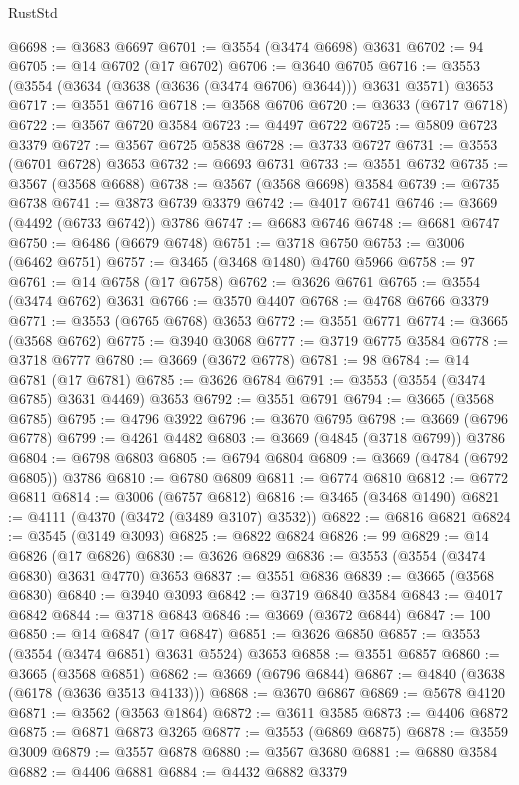 \begin{lexlean}{RustStd}
\begin{coremodule}
@6698 := @3683 @6697
@6701 := @3554 (@3474 @6698) @3631
@6702 := 94
@6705 := @14 @6702 (@17 @6702)
@6706 := @3640 @6705
@6716 := @3553 (@3554 (@3634 (@3638 (@3636 (@3474 @6706) @3644))) @3631 @3571) @3653
@6717 := @3551 @6716
@6718 := @3568 @6706
@6720 := @3633 (@6717 @6718)
@6722 := @3567 @6720 @3584
@6723 := @4497 @6722
@6725 := @5809 @6723 @3379
@6727 := @3567 @6725 @5838
@6728 := @3733 @6727
@6731 := @3553 (@6701 @6728) @3653
@6732 := @6693 @6731
@6733 := @3551 @6732
@6735 := @3567 (@3568 @6688)
@6738 := @3567 (@3568 @6698) @3584
@6739 := @6735 @6738
@6741 := @3873 @6739 @3379
@6742 := @4017 @6741
@6746 := @3669 (@4492 (@6733 @6742)) @3786
@6747 := @6683 @6746
@6748 := @6681 @6747
@6750 := @6486 (@6679 @6748)
@6751 := @3718 @6750
@6753 := @3006 (@6462 @6751)
@6757 := @3465 (@3468 @1480) @4760 @5966
@6758 := 97
@6761 := @14 @6758 (@17 @6758)
@6762 := @3626 @6761
@6765 := @3554 (@3474 @6762) @3631
@6766 := @3570 @4407
@6768 := @4768 @6766 @3379
@6771 := @3553 (@6765 @6768) @3653
@6772 := @3551 @6771
@6774 := @3665 (@3568 @6762)
@6775 := @3940 @3068
@6777 := @3719 @6775 @3584
@6778 := @3718 @6777
@6780 := @3669 (@3672 @6778)
@6781 := 98
@6784 := @14 @6781 (@17 @6781)
@6785 := @3626 @6784
@6791 := @3553 (@3554 (@3474 @6785) @3631 @4469) @3653
@6792 := @3551 @6791
@6794 := @3665 (@3568 @6785)
@6795 := @4796 @3922
@6796 := @3670 @6795
@6798 := @3669 (@6796 @6778)
@6799 := @4261 @4482
@6803 := @3669 (@4845 (@3718 @6799)) @3786
@6804 := @6798 @6803
@6805 := @6794 @6804
@6809 := @3669 (@4784 (@6792 @6805)) @3786
@6810 := @6780 @6809
@6811 := @6774 @6810
@6812 := @6772 @6811
@6814 := @3006 (@6757 @6812)
@6816 := @3465 (@3468 @1490)
@6821 := @4111 (@4370 (@3472 (@3489 @3107) @3532))
@6822 := @6816 @6821
@6824 := @3545 (@3149 @3093)
@6825 := @6822 @6824
@6826 := 99
@6829 := @14 @6826 (@17 @6826)
@6830 := @3626 @6829
@6836 := @3553 (@3554 (@3474 @6830) @3631 @4770) @3653
@6837 := @3551 @6836
@6839 := @3665 (@3568 @6830)
@6840 := @3940 @3093
@6842 := @3719 @6840 @3584
@6843 := @4017 @6842
@6844 := @3718 @6843
@6846 := @3669 (@3672 @6844)
@6847 := 100
@6850 := @14 @6847 (@17 @6847)
@6851 := @3626 @6850
@6857 := @3553 (@3554 (@3474 @6851) @3631 @5524) @3653
@6858 := @3551 @6857
@6860 := @3665 (@3568 @6851)
@6862 := @3669 (@6796 @6844)
@6867 := @4840 (@3638 (@6178 (@3636 @3513 @4133)))
@6868 := @3670 @6867
@6869 := @5678 @4120
@6871 := @3562 (@3563 @1864)
@6872 := @3611 @3585
@6873 := @4406 @6872
@6875 := @6871 @6873 @3265
@6877 := @3553 (@6869 @6875)
@6878 := @3559 @3009
@6879 := @3557 @6878
@6880 := @3567 @3680
@6881 := @6880 @3584
@6882 := @4406 @6881
@6884 := @4432 @6882 @3379

\end{coremodule}
\end{lexlean}
